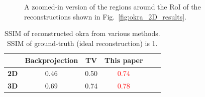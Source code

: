 \documentclass[journal]{IEEEtran}
\begin{document}
\begin{figure}[!h]
\centering
{}
{}
\caption{A zoomed-in version of the regions around the RoI of the reconstructions shown in Fig.~\ref{fig:okra_2D_results}. }
\label{fig:okra_zoomed_2D_results}
\end{figure}


\begin{table}[!h]
  \centering
  \caption{SSIM of reconstructed okra from various
    methods. SSIM of ground-truth (ideal reconstruction) is 1.}
\begin{tabular}{|l|c|c|c|c|c|}
\hline &
\textbf{Backprojection} & \textbf{TV} &
\textbf{This paper} \\ \hline \textbf{2D} & 0.46
& 0.50 & \textcolor{red}{0.74} \\ \hline \textbf{3D} & 0.69 & 0.74 & \textcolor{red}{0.78}
\\ \hline
\end{tabular}
\label{table:okra_ssim}
\end{table}
\end{document}
